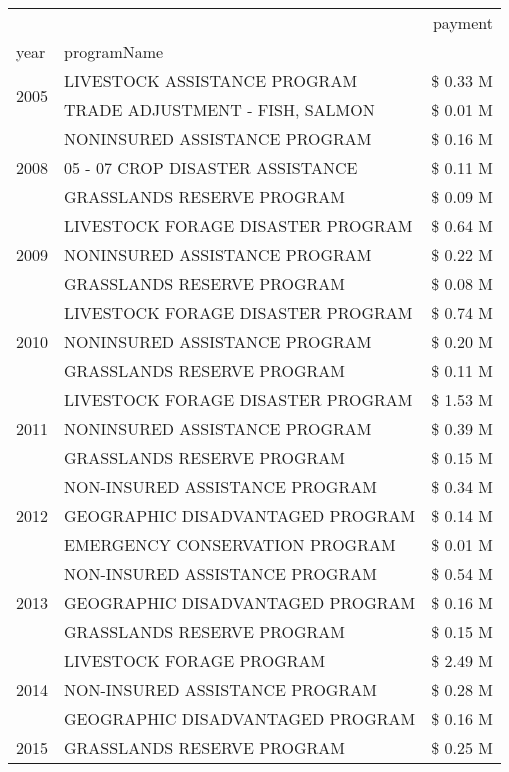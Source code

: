 \begin{tabular}{llr}
\toprule
 &  & payment \\
year & programName &  \\
\midrule
\multirow[t]{2}{*}{2005} & LIVESTOCK ASSISTANCE PROGRAM & \$ 0.33 M \\
 & TRADE ADJUSTMENT - FISH, SALMON & \$ 0.01 M \\
\cline{1-3}
\multirow[t]{3}{*}{2008} & NONINSURED ASSISTANCE PROGRAM & \$ 0.16 M \\
 & 05 - 07 CROP DISASTER ASSISTANCE & \$ 0.11 M \\
 & GRASSLANDS RESERVE PROGRAM & \$ 0.09 M \\
\cline{1-3}
\multirow[t]{3}{*}{2009} & LIVESTOCK FORAGE DISASTER  PROGRAM & \$ 0.64 M \\
 & NONINSURED ASSISTANCE PROGRAM & \$ 0.22 M \\
 & GRASSLANDS RESERVE PROGRAM & \$ 0.08 M \\
\cline{1-3}
\multirow[t]{3}{*}{2010} & LIVESTOCK FORAGE DISASTER PROGRAM & \$ 0.74 M \\
 & NONINSURED ASSISTANCE PROGRAM & \$ 0.20 M \\
 & GRASSLANDS RESERVE PROGRAM & \$ 0.11 M \\
\cline{1-3}
\multirow[t]{3}{*}{2011} & LIVESTOCK FORAGE DISASTER PROGRAM & \$ 1.53 M \\
 & NONINSURED ASSISTANCE PROGRAM & \$ 0.39 M \\
 & GRASSLANDS RESERVE PROGRAM & \$ 0.15 M \\
\cline{1-3}
\multirow[t]{3}{*}{2012} & NON-INSURED ASSISTANCE PROGRAM & \$ 0.34 M \\
 & GEOGRAPHIC DISADVANTAGED PROGRAM & \$ 0.14 M \\
 & EMERGENCY CONSERVATION PROGRAM & \$ 0.01 M \\
\cline{1-3}
\multirow[t]{3}{*}{2013} & NON-INSURED ASSISTANCE PROGRAM & \$ 0.54 M \\
 & GEOGRAPHIC DISADVANTAGED PROGRAM & \$ 0.16 M \\
 & GRASSLANDS RESERVE PROGRAM & \$ 0.15 M \\
\cline{1-3}
\multirow[t]{3}{*}{2014} & LIVESTOCK FORAGE PROGRAM & \$ 2.49 M \\
 & NON-INSURED ASSISTANCE PROGRAM & \$ 0.28 M \\
 & GEOGRAPHIC DISADVANTAGED PROGRAM & \$ 0.16 M \\
\cline{1-3}
\multirow[t]{3}{*}{2015} & GRASSLANDS RESERVE PROGRAM & \$ 0.25 M \\

\end{tabular}
